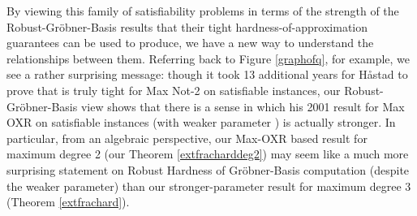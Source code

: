 \documentclass{article}
\begin{document}
By viewing this family of satisfiability problems in terms of the strength of the Robust-Gr\"{o}bner-Basis results that their tight hardness-of-approximation guarantees can be used to produce, we have a new way to understand the relationships between them. Referring back to Figure \ref{graphofq}, for example, we see a rather surprising message: though it took 13 additional years for H{\aa}stad to prove that  is truly tight for Max Not-2 on satisfiable instances, our Robust-Gr\"{o}bner-Basis view shows that there is a sense in which his 2001 result for Max OXR on satisfiable instances (with weaker parameter ) is actually stronger. In particular, from an algebraic perspective, our Max-OXR based result for maximum degree 2 (our Theorem \ref{extfracharddeg2}) may seem like a much more surprising statement on Robust Hardness of Gr\"{o}bner-Basis computation (despite the weaker  parameter) than our stronger-parameter result for maximum degree 3 (Theorem \ref{extfrachard}).



\end{document}
